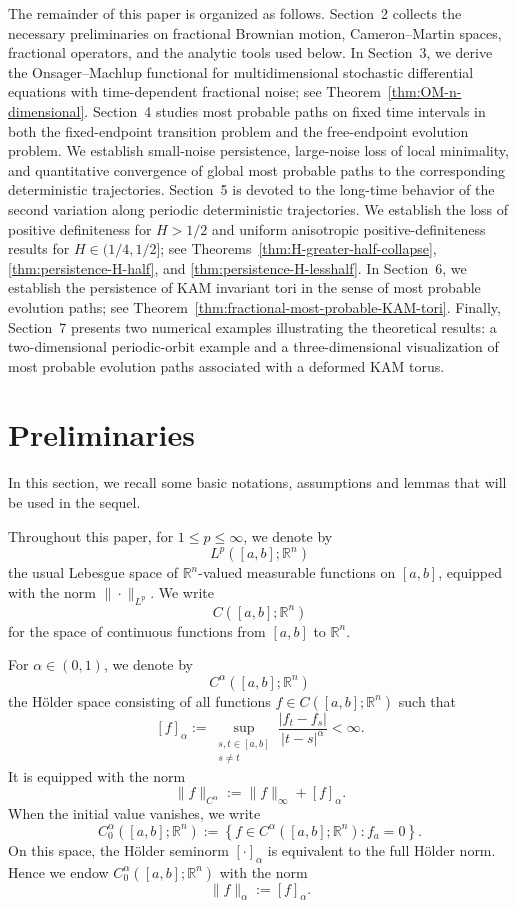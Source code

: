 \documentclass[preprint,12pt]{elsarticle}
\theoremstyle{definition}
\theoremstyle{plain}
\begin{document}
The remainder of this paper is organized as follows. Section~2 collects the
necessary preliminaries on fractional Brownian motion, Cameron--Martin spaces,
fractional operators, and the analytic tools used below. In Section~3, we
derive the Onsager--Machlup functional for multidimensional stochastic
differential equations with time-dependent fractional noise; see
Theorem~\ref{thm:OM-n-dimensional}. Section~4 studies most probable paths on
fixed time intervals in both the fixed-endpoint transition problem and the
free-endpoint evolution problem. We establish small-noise persistence,
large-noise loss of local minimality, and quantitative convergence of global
most probable paths to the corresponding deterministic trajectories.
Section~5 is devoted to the long-time behavior of the second variation along
periodic deterministic trajectories. We establish the loss of positive
definiteness for $H>1/2$ and uniform anisotropic positive-definiteness results
for $H\in(1/4,1/2]$; see
Theorems~\ref{thm:H-greater-half-collapse},
\ref{thm:persistence-H-half}, and
\ref{thm:persistence-H-lesshalf}. In Section~6, we establish the persistence
of KAM invariant tori in the sense of most probable evolution paths; see
Theorem~\ref{thm:fractional-most-probable-KAM-tori}. Finally, Section~7 presents two numerical examples illustrating the
theoretical results: a two-dimensional periodic-orbit example and a
three-dimensional visualization of most probable evolution paths
associated with a deformed KAM torus.



\section{Preliminaries}  \label{perliminary}
In this section, we recall some basic notations, assumptions and lemmas that will be used in the sequel.

   
Throughout this paper, for $1\leq p\leq \infty$, we denote by
\[
    L^p([a,b];\mathbb R^n)
\]
the usual Lebesgue space of $\mathbb R^n$-valued measurable functions on
$[a,b]$, equipped with the norm $\|\cdot\|_{L^p}$. We write
\[
    C([a,b];\mathbb R^n)
\]
for the space of continuous functions from $[a,b]$ to $\mathbb R^n$.

For $\alpha\in(0,1)$, we denote by
\[
    C^\alpha([a,b];\mathbb R^n)
\]
the Hölder space consisting of all functions $f\in C([a,b];\mathbb R^n)$ such
that
\[
    [f]_\alpha
    :=
    \sup_{\substack{s,t\in[a,b]\\ s\neq t}}
    \frac{|f_t-f_s|}{|t-s|^\alpha}
    <\infty .
\]
It is equipped with the norm
\[
    \|f\|_{C^\alpha}
    :=
    \|f\|_\infty+[f]_\alpha .
\]
When the initial value vanishes, we write
\[
    C_0^\alpha([a,b];\mathbb R^n)
    :=
    \left\{
    f\in C^\alpha([a,b];\mathbb R^n): f_a=0
    \right\}.
\]
On this space, the Hölder seminorm $[\cdot]_\alpha$ is equivalent to the full
Hölder norm. Hence we endow $C_0^\alpha([a,b];\mathbb R^n)$ with the norm
\[
    \|f\|_\alpha := [f]_\alpha .
\]
\end{document}
